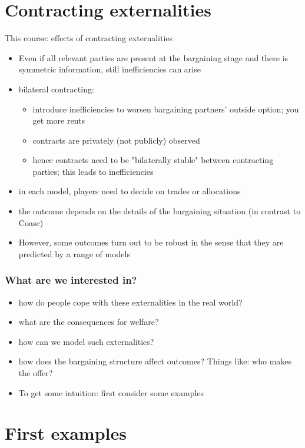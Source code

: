 \documentclass[11pt,english]{beamer}
\begin{document}
\section{Contracting externalities}
\begin{frame}{This course: effects of contracting
    externalities}
  \begin{itemize}
  \item Even if all relevant parties are present at the bargaining
    stage and there is symmetric information, still inefficiencies can
    arise
  \item bilateral contracting:
    \begin{itemize}
    \item introduce inefficiencies to worsen bargaining partners'
      outside option; you get more rents
    \item contracts are privately (not publicly) observed
    \item hence contracts need to be "bilaterally stable" between
      contracting parties; this leads to inefficiencies
    \end{itemize}
  \item in each model, players need to decide on trades or allocations
  \item the outcome depends on the details of the bargaining situation
    (in contrast to Coase)
  \item However, some outcomes turn out to be robust in the sense that
    they are predicted by a range of models
  \end{itemize} %
\end{frame}

\begin{frame}\frametitle{What are we interested in?}
  \begin{itemize}
  \item how do people cope with these externalities in the real world?
  \item what are the consequences for welfare?
  \item how can we model such externalities?
  \item how does the bargaining structure affect outcomes? Things
    like: who makes the offer?
  \item To get some intuition: first consider some examples
  \end{itemize} %
\end{frame}

\section{First examples}
\end{document}
